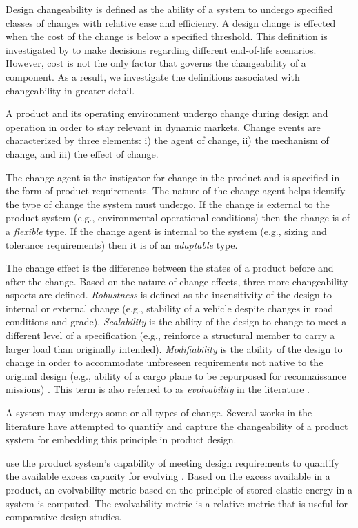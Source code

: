Design changeability is defined as the ability of a system to undergo specified classes of changes with relative ease and efficiency. A design change is effected when the cost of the change is below a specified threshold. This definition is investigated by \citeauthor{Lawand2019} \cite{Lawand2019} to make decisions regarding different end-of-life scenarios. However, cost is not the only factor that governs the changeability of a component. As a result, we investigate the definitions associated with changeability in greater detail.

A product and its operating environment undergo change during design and operation in order to stay relevant in dynamic markets. Change events are characterized by three elements: i) the agent of change, ii) the mechanism of change, and iii) the effect of change. 

The change agent is the instigator for change in the product and is specified in the form of product requirements. The nature of the change agent helps identify the type of change the system must undergo. If the change is external to the product system (e.g., environmental operational conditions) then the change is of a \textit{flexible} type. If the change agent is internal to the system (e.g., sizing and tolerance requirements) then it is of an \textit{adaptable} type. 

The change effect is the difference between the states of a product before and after the change. Based on the nature of change effects, three more changeability aspects are defined. \textit{Robustness} is defined as the insensitivity of the design to internal or external change (e.g., stability of a vehicle despite changes in road conditions and grade). \textit{Scalability} is the ability of the design to change to meet a different level of a specification (e.g., reinforce a structural member to carry a larger load than originally intended). \textit{Modifiability} is the ability of the design to change in order to accommodate unforeseen requirements not native to the original design (e.g., ability of a cargo plane to be repurposed for reconnaissance missions) \cite{Ross2008}. This term is also referred to as \textit{evolvability} in the literature \cite{Tackett2014}. 

A system may undergo some or all types of change. Several works in the literature have attempted to quantify and capture the changeability of a product system for embedding this principle in product design. 

\citeauthor{Tackett2014} use the product system's capability of meeting design requirements to quantify the available excess capacity for evolving \cite{Tackett2014}. Based on the excess available in a product, an evolvability metric based on the principle of stored elastic energy in a system is computed. The evolvability metric is a relative metric that is useful for comparative design studies.

